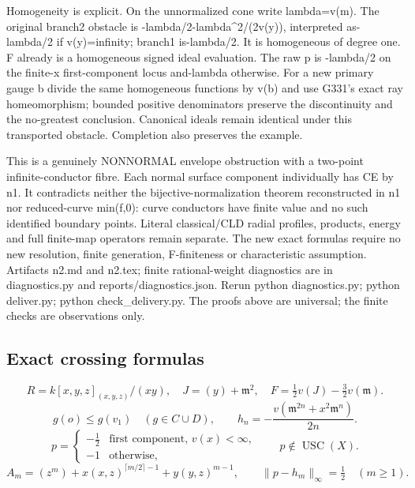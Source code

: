 Homogeneity is explicit. On the unnormalized cone write lambda=v(m). The original branch2 obstacle is -lambda/2-lambda\textasciicircum{}2/(2v(y)), interpreted as- lambda/2 if v(y)=infinity; branch1 is-lambda/2. It is homogeneous of degree one. F already is a homogeneous signed ideal evaluation. The raw p is -lambda/2 on the finite-x first-component locus and-lambda otherwise. For a new primary gauge b divide the same homogeneous functions by v(b) and use G331's exact ray homeomorphism; bounded positive denominators preserve the discontinuity and the no-greatest conclusion. Canonical ideals remain identical under this transported obstacle. Completion also preserves the example.

This is a genuinely NONNORMAL envelope obstruction with a two-point infinite-conductor fibre. Each normal surface component individually has CE by n1. It contradicts neither the bijective-normalization theorem reconstructed in n1 nor reduced-curve min(f,0): curve conductors have finite value and no such identified boundary points. Literal classical/CLD radial profiles, products, energy and full finite-map operators remain separate. The new exact formulas require no new resolution, finite generation, F-finiteness or characteristic assumption. Artifacts n2.md and n2.tex; finite rational-weight diagnostics are in diagnostics.py and reports/diagnostics.json. Rerun python diagnostics.py; python deliver.py; python check\_delivery.py. The proofs above are universal; the finite checks are observations only.

\subsection*{Exact crossing formulas}
\[
 R=k[x,y,z]_{(x,y,z)}/(xy),\quad
 J=(y)+\mathfrak m^2,\quad F=\tfrac12v(J)-\tfrac32v(\mathfrak m).
\]
\[
 g(o)\le g(v_1)\quad(g\in C\cup D),\qquad
 h_n=-\frac{v(\mathfrak m^{2n}+x^2\mathfrak m^n)}{2n}.
\]
\[
 p=\begin{cases}-\tfrac12&\text{first component, }v(x)<\infty,\\
 -1&\text{otherwise},\end{cases}\qquad p\notin\operatorname{USC}(X).
\]
\[
 A_m=(z^m)+x(x,z)^{\lceil m/2\rceil-1}+y(y,z)^{m-1},\qquad
 \|p-h_m\|_\infty=\tfrac12\quad(m\ge1).
\]

